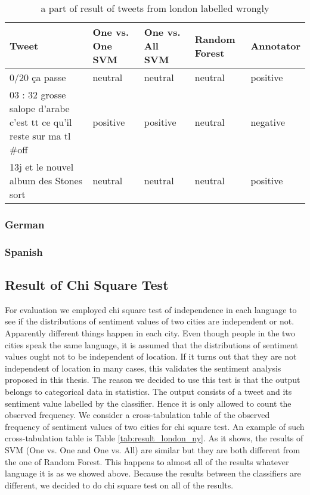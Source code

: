 \begin{table}[ht]
	\caption{a part of result of tweets from london labelled wrongly}
	\begin{tabular}{|p{5cm}|p{1.8cm}|p{1.8cm}|p{1.8cm}|p{1.8cm}|} \hline
	Tweet & One vs. One SVM &One vs. All SVM &Random Forest & Annotator\\ \hline
	0/20 \c ca passe & neutral & neutral & neutral & positive \\ \hline
	03 : 32 grosse salope d'arabe c'est tt ce qu'il reste sur ma tl \#off & positive & positive & neutral & negative \\ \hline
	13j et le nouvel album des Stones sort & neutral& neutral& neutral & positive \\ \hline
	\end{tabular}
	\label{tab:wrong_tweets_fr}
\end{table}

\clearpage
\subsubsection{German}
\subsubsection{Spanish}



\subsection{Result of Chi Square Test}
For evaluation we employed chi square test of independence in each language to see if the distributions of sentiment values of two cities are independent or not. 
Apparently different things happen in each city.
Even though people in the two cities speak the same language, it is assumed that the distributions of sentiment values ought not to be independent of location.  
If it turns out that they are not independent of location in many cases, this validates the sentiment analysis proposed in this thesis.
The reason we decided to use this test is that the output belongs to categorical data in statistics.
The output consists of a tweet and its sentiment value labelled by the classifier.
Hence it is only allowed to count the observed frequency.
We consider a cross-tabulation table of the observed frequency of sentiment values of two cities for chi square test.
An example of such cross-tabulation table is Table \ref{tab:result_london_ny}.
As it shows, the results of SVM (One vs. One and One vs. All) are similar but they are both different from the one of Random Forest.
This happens to almost all of the results whatever language it is as we showed above.
Because the results between the classifiers are different, we decided to do chi square test on all of the results.

